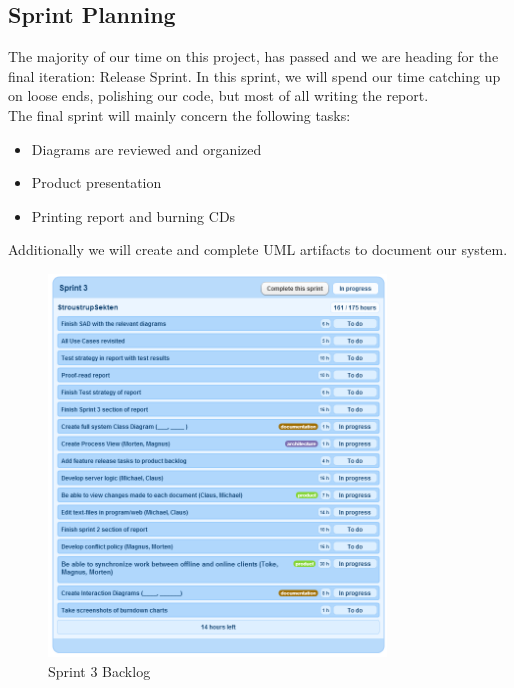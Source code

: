\subsection{Sprint Planning}
The majority of our time on this project, has passed and we are heading for the final iteration: Release Sprint. In this sprint, we will spend our time catching up on loose ends, polishing our code, but most of all writing the report.\\
The final sprint will mainly concern the following tasks: 
\begin{itemize}
\item Diagrams are reviewed and organized
\item Product presentation 
\item Printing report and burning CDs
\end{itemize}
Additionally we will create and complete UML artifacts to document our system.
\begin{figure}[H]
\centering
  \includegraphics[width=0.8\textwidth]{illustrations/sprint3backlog.PNG}
  \caption{Sprint 3 Backlog}
  \label{sprint3backlog}
\end{figure}